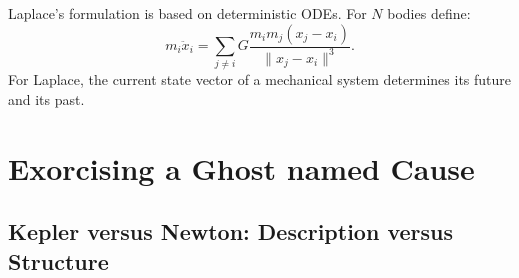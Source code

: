 \documentclass[12pt]{article}
\begin{document}
Laplace's formulation is based on deterministic ODEs. For $N$ bodies define:
\[
m_i \ddot{x}_i = \sum_{j \neq i} G \frac{m_i m_j (x_j - x_i)}{\|x_j - x_i\|^3}.
\]
For Laplace, the current  state vector of a mechanical system determines its  future and its past. 
%
%
%
%
%
%
%
%
%
%
%



\section*{Exorcising a Ghost named Cause}

\subsection*{Kepler versus Newton: Description versus Structure}
\end{document}
